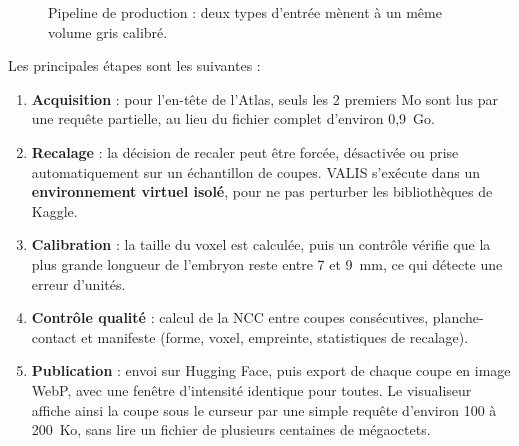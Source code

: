 \documentclass[12pt,a4paper]{report}
\begin{document}
\begin{figure}[H]
\centering
{}
\caption[Pipeline de production]{Pipeline de production : deux types d'entrée mènent à un même volume gris calibré.}
\label{fig:prod}
\end{figure}

Les principales étapes sont les suivantes :
\begin{enumerate}
    \item \textbf{Acquisition} : pour l'en-tête de l'Atlas, seuls les 2 premiers Mo sont lus par une requête partielle, au lieu du fichier complet d'environ 0,9~Go.
    \item \textbf{Recalage} : la décision de recaler peut être forcée, désactivée ou prise automatiquement sur un échantillon de coupes. VALIS s'exécute dans un \textbf{environnement virtuel isolé}, pour ne pas perturber les bibliothèques de Kaggle.
    \item \textbf{Calibration} : la taille du voxel est calculée, puis un contrôle vérifie que la plus grande longueur de l'embryon reste entre 7 et 9~mm, ce qui détecte une erreur d'unités.
    \item \textbf{Contrôle qualité} : calcul de la NCC entre coupes consécutives, planche-contact et manifeste (forme, voxel, empreinte, statistiques de recalage).
    \item \textbf{Publication} : envoi sur Hugging Face, puis export de chaque coupe en image WebP, avec une fenêtre d'intensité identique pour toutes. Le visualiseur affiche ainsi la coupe sous le curseur par une simple requête d'environ 100 à 200~Ko, sans lire un fichier de plusieurs centaines de mégaoctets.
\end{enumerate}
\end{document}
